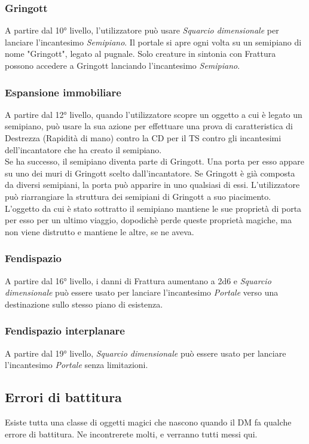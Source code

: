 \subsubsection{Gringott}
A partire dal 10° livello, l'utilizzatore può usare \textit{Squarcio dimensionale} per lanciare l'incantesimo \textit{Semipiano}. Il portale si apre ogni volta su un semipiano di nome "Gringott", legato al pugnale. Solo creature in sintonia con Frattura possono accedere a Gringott lanciando l'incantesimo \textit{Semipiano}.

\subsubsection{Espansione immobiliare}
A partire dal 12° livello, quando l'utilizzatore scopre un oggetto a cui è legato un semipiano, può usare la sua azione per effettuare una prova di caratteristica di Destrezza (Rapidità di mano) contro la CD per il TS contro gli incantesimi dell'incantatore che ha creato il semipiano.\\
Se ha successo, il semipiano diventa parte di Gringott. Una porta per esso appare su uno dei muri di Gringott scelto dall'incantatore. Se Gringott è già composta da diversi semipiani, la porta può apparire in uno qualsiasi di essi. L'utilizzatore può riarrangiare la struttura dei semipiani di Gringott a suo piacimento.\\
L'oggetto da cui è stato sottratto il semipiano mantiene le sue proprietà di porta per esso per un ultimo viaggio, dopodichè perde queste proprietà magiche, ma non viene distrutto e mantiene le altre, se ne aveva.

\subsubsection{Fendispazio}
A partire dal 16° livello, i danni di Frattura aumentano a 2d6 e \textit{Squarcio dimensionale} può essere usato per lanciare l'incantesimo \textit{Portale} verso una destinazione sullo stesso piano di esistenza.

\subsubsection{Fendispazio interplanare}
A partire dal 19° livello, \textit{Squarcio dimensionale} può essere usato per lanciare l'incantesimo \textit{Portale} senza limitazioni.

\subsection{Errori di battitura}
Esiste tutta una classe di oggetti magici che nascono quando il DM fa qualche errore di battitura. Ne incontrerete molti, e verranno tutti messi qui.

